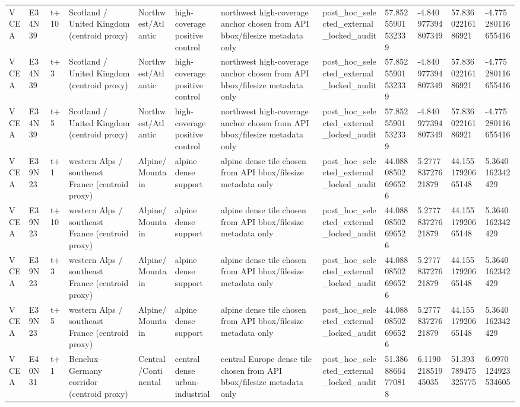 \begin{landscape}
\begin{longtable}{llllllllllll}
VCEA & E34N39 & t+10 & Scotland / United Kingdom (centroid proxy) & Northwest/Atlantic & high-coverage positive control & northwest high-coverage anchor chosen from API bbox/filesize metadata only & post\_hoc\_selected\_external\_locked\_audit & 57.85255901532339 & -4.840977394807349 & 57.83602216186921 & -4.775280116655416 \\
VCEA & E34N39 & t+3 & Scotland / United Kingdom (centroid proxy) & Northwest/Atlantic & high-coverage positive control & northwest high-coverage anchor chosen from API bbox/filesize metadata only & post\_hoc\_selected\_external\_locked\_audit & 57.85255901532339 & -4.840977394807349 & 57.83602216186921 & -4.775280116655416 \\
VCEA & E34N39 & t+5 & Scotland / United Kingdom (centroid proxy) & Northwest/Atlantic & high-coverage positive control & northwest high-coverage anchor chosen from API bbox/filesize metadata only & post\_hoc\_selected\_external\_locked\_audit & 57.85255901532339 & -4.840977394807349 & 57.83602216186921 & -4.775280116655416 \\
VCEA & E39N23 & t+1 & western Alps / southeast France (centroid proxy) & Alpine/Mountain & alpine dense support & alpine dense tile chosen from API bbox/filesize metadata only & post\_hoc\_selected\_external\_locked\_audit & 44.08808502696526 & 5.277783727621879 & 44.15517920665148 & 5.3640162342429 \\
VCEA & E39N23 & t+10 & western Alps / southeast France (centroid proxy) & Alpine/Mountain & alpine dense support & alpine dense tile chosen from API bbox/filesize metadata only & post\_hoc\_selected\_external\_locked\_audit & 44.08808502696526 & 5.277783727621879 & 44.15517920665148 & 5.3640162342429 \\
VCEA & E39N23 & t+3 & western Alps / southeast France (centroid proxy) & Alpine/Mountain & alpine dense support & alpine dense tile chosen from API bbox/filesize metadata only & post\_hoc\_selected\_external\_locked\_audit & 44.08808502696526 & 5.277783727621879 & 44.15517920665148 & 5.3640162342429 \\
VCEA & E39N23 & t+5 & western Alps / southeast France (centroid proxy) & Alpine/Mountain & alpine dense support & alpine dense tile chosen from API bbox/filesize metadata only & post\_hoc\_selected\_external\_locked\_audit & 44.08808502696526 & 5.277783727621879 & 44.15517920665148 & 5.3640162342429 \\
VCEA & E40N31 & t+1 & Benelux–Germany corridor (centroid proxy) & Central/Continental & central dense urban-industrial & central Europe dense tile chosen from API bbox/filesize metadata only & post\_hoc\_selected\_external\_locked\_audit & 51.38688664770818 & 6.119021851945035 & 51.393789475325775 & 6.0970124923534605 \\

\end{longtable}
\end{landscape}
